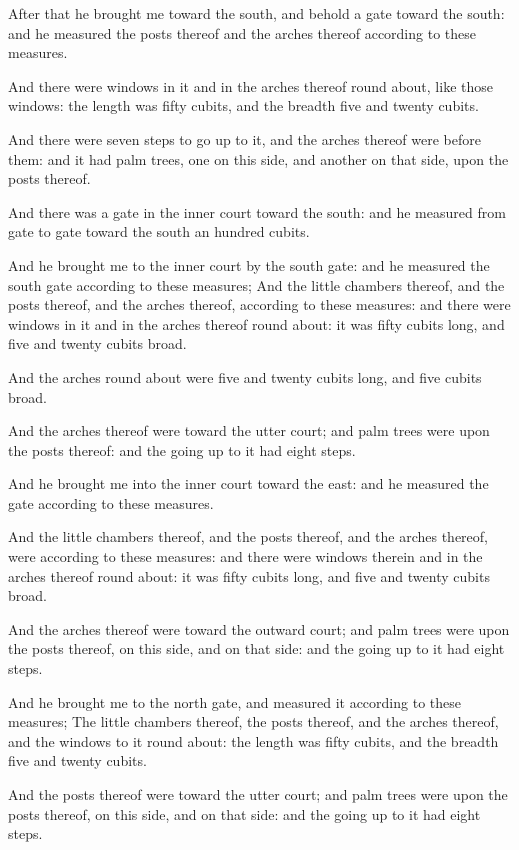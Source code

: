 \verse After that he brought me toward the south, and behold a gate toward the south: and he measured the posts thereof and the arches thereof according to these measures.

\verse And there were windows in it and in the arches thereof round about, like those windows: the length was fifty cubits, and the breadth five and twenty cubits.

\verse And there were seven steps to go up to it, and the arches thereof were before them: and it had palm trees, one on this side, and another on that side, upon the posts thereof.

\verse And there was a gate in the inner court toward the south: and he measured from gate to gate toward the south an hundred cubits.

\verse And he brought me to the inner court by the south gate: and he measured the south gate according to these measures; \verse And the little chambers thereof, and the posts thereof, and the arches thereof, according to these measures: and there were windows in it and in the arches thereof round about: it was fifty cubits long, and five and twenty cubits broad.

\verse And the arches round about were five and twenty cubits long, and five cubits broad.

\verse And the arches thereof were toward the utter court; and palm trees were upon the posts thereof: and the going up to it had eight steps.

\verse And he brought me into the inner court toward the east: and he measured the gate according to these measures.

\verse And the little chambers thereof, and the posts thereof, and the arches thereof, were according to these measures: and there were windows therein and in the arches thereof round about: it was fifty cubits long, and five and twenty cubits broad.

\verse And the arches thereof were toward the outward court; and palm trees were upon the posts thereof, on this side, and on that side: and the going up to it had eight steps.

\verse And he brought me to the north gate, and measured it according to these measures; \verse The little chambers thereof, the posts thereof, and the arches thereof, and the windows to it round about: the length was fifty cubits, and the breadth five and twenty cubits.

\verse And the posts thereof were toward the utter court; and palm trees were upon the posts thereof, on this side, and on that side: and the going up to it had eight steps.

